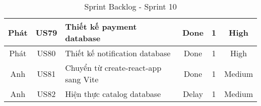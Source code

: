 \begin{table}[H]
\begin{tabular}{|c|c|m{6cm}|c|c|c|}
    Phát        & US79        & Thiết kế payment database                    & Done            & 1                   & High         \\ \hline
    Phát        & US80        & Thiết kế notification database                   & Done            & 1                   & High         \\ \hline
    Anh         & US81        & Chuyển từ create-react-app sang Vite                   & Done            & 1                   & Medium         \\ \hline
    Anh         & US82        & Hiện thực catalog database                   & Delay            & 1                   & Medium         \\ \hline
    \end{tabular}
    \caption{Sprint Backlog - Sprint 10}
    \label{tab:sprint-10}
\end{table}
